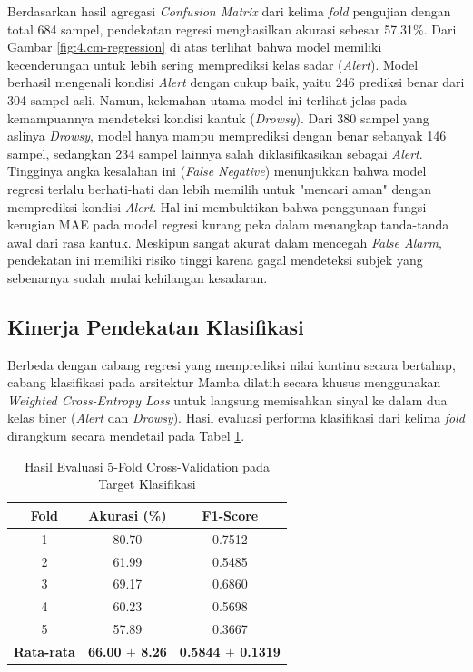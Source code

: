 Berdasarkan hasil agregasi \textit{Confusion Matrix} dari kelima \textit{fold} pengujian dengan total 684 sampel, pendekatan regresi menghasilkan akurasi sebesar 57,31\%. Dari Gambar \ref{fig:4.cm-regression} di atas terlihat bahwa model memiliki kecenderungan untuk lebih sering memprediksi kelas sadar (\textit{Alert}). Model berhasil mengenali kondisi \textit{Alert} dengan cukup baik, yaitu 246 prediksi benar dari 304 sampel asli. Namun, kelemahan utama model ini terlihat jelas pada kemampuannya mendeteksi kondisi kantuk (\textit{Drowsy}). Dari 380 sampel yang aslinya \textit{Drowsy}, model hanya mampu memprediksi dengan benar sebanyak 146 sampel, sedangkan 234 sampel lainnya salah diklasifikasikan sebagai \textit{Alert}. Tingginya angka kesalahan ini (\textit{False Negative}) menunjukkan bahwa model regresi terlalu berhati-hati dan lebih memilih untuk "mencari aman" dengan memprediksi kondisi \textit{Alert}. Hal ini membuktikan bahwa penggunaan fungsi kerugian MAE pada model regresi kurang peka dalam menangkap tanda-tanda awal dari rasa kantuk. Meskipun sangat akurat dalam mencegah \textit{False Alarm}, pendekatan ini memiliki risiko tinggi karena gagal mendeteksi subjek yang sebenarnya sudah mulai kehilangan kesadaran.

\subsection{Kinerja Pendekatan Klasifikasi}
Berbeda dengan cabang regresi yang memprediksi nilai kontinu secara bertahap, cabang klasifikasi pada arsitektur Mamba dilatih secara khusus menggunakan \textit{Weighted Cross-Entropy Loss} untuk langsung memisahkan sinyal ke dalam dua kelas biner (\textit{Alert} dan \textit{Drowsy}). Hasil evaluasi performa klasifikasi dari kelima \textit{fold} dirangkum secara mendetail pada Tabel \ref{tab:hasil_klasifikasi}.

\begin{table}[H]
    \centering
    \caption{Hasil Evaluasi 5-Fold Cross-Validation pada Target Klasifikasi}
    \label{tab:hasil_klasifikasi}
    \begin{tabular}{ccc}
        \hline
        \textbf{Fold} & \textbf{Akurasi (\%)} & \textbf{F1-Score} \\
        \hline
        1 & 80.70 & 0.7512 \\
        2 & 61.99 & 0.5485 \\
        3 & 69.17 & 0.6860 \\
        4 & 60.23 & 0.5698 \\
        5 & 57.89 & 0.3667 \\
        \hline
        \textbf{Rata-rata} & \textbf{66.00 $\pm$ 8.26} & \textbf{0.5844 $\pm$ 0.1319} \\
        \hline
    \end{tabular}
\end{table}

